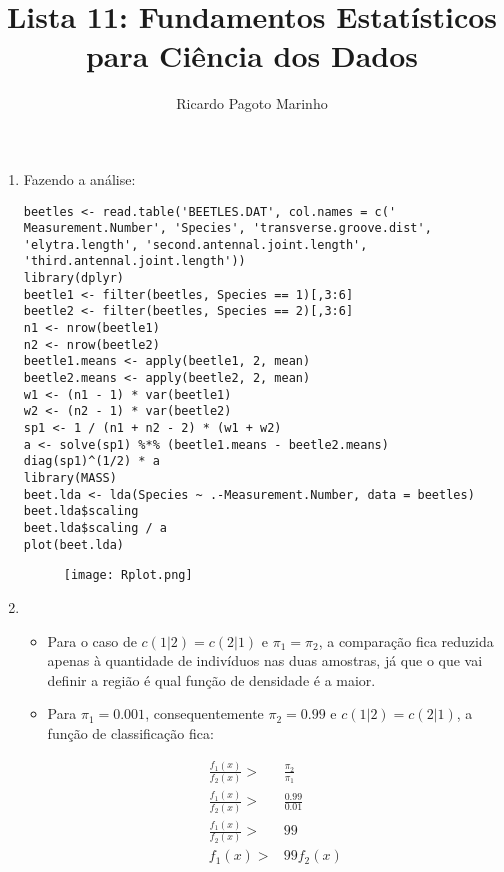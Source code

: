 \documentclass[11pt,a4paper]{book}
\title{Lista 11: Fundamentos Estatísticos para Ciência dos Dados}
\author{Ricardo Pagoto Marinho}
\begin{document}
\maketitle
	\begin{enumerate}
		\item
		
		Fazendo a análise:
		
		\begin{lstlisting}
beetles <- read.table('BEETLES.DAT', col.names = c('
Measurement.Number', 'Species', 'transverse.groove.dist',
'elytra.length', 'second.antennal.joint.length',
'third.antennal.joint.length'))
library(dplyr)
beetle1 <- filter(beetles, Species == 1)[,3:6]
beetle2 <- filter(beetles, Species == 2)[,3:6]
n1 <- nrow(beetle1)
n2 <- nrow(beetle2)
beetle1.means <- apply(beetle1, 2, mean)
beetle2.means <- apply(beetle2, 2, mean)
w1 <- (n1 - 1) * var(beetle1)
w2 <- (n2 - 1) * var(beetle2)
sp1 <- 1 / (n1 + n2 - 2) * (w1 + w2)
a <- solve(sp1) %*% (beetle1.means - beetle2.means)
diag(sp1)^(1/2) * a
library(MASS)
beet.lda <- lda(Species ~ .-Measurement.Number, data = beetles)
beet.lda$scaling
beet.lda$scaling / a
plot(beet.lda)

		\end{lstlisting}
		
		\begin{figure}[h]
		\centering
		\texttt{[image: Rplot.png]}
		\end{figure}
		\item
		\begin{itemize}
		
			\item
			
			Para o caso de $c(1|2)=c(2|1)$ e $\pi_1=\pi_2$, a comparação fica reduzida apenas à quantidade de indivíduos nas duas amostras, já que o que vai definir a região é qual função de densidade é a maior.
			
			\item 
			
			Para $\pi_1=0.001$, consequentemente $\pi_2=0.99$ e $c(1|2)=c(2|1)$, a função de classificação fica:
			
			\begin{eqnarray*}
				\frac{f_1(x)}{f_2(x)}>&\frac{\pi_2}{\pi_1}\\
				\frac{f_1(x)}{f_2(x)}>&\frac{0.99}{0.01}\\
				\frac{f_1(x)}{f_2(x)}>&99\\
				f_1(x)>&99f_2(x)
			\end{eqnarray*}
			

\end{itemize}
\end{enumerate}
\end{document}
